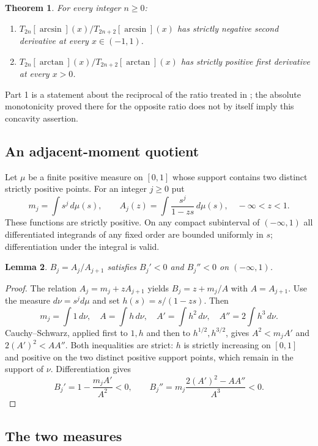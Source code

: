 \documentclass[11pt,a4paper]{article}
\numberwithin{equation}{section}
\newtheorem{theorem}{Theorem}[section]
\newtheorem{lemma}[theorem]{Lemma}
\theoremstyle{definition}
\theoremstyle{remark}
\begin{document}
\begin{theorem}\label{r26meiji:main}
For every integer $n\ge0$:
\begin{enumerate}
\item $T_{2n}[\arcsin](x)/T_{2n+2}[\arcsin](x)$ has strictly negative
second derivative at every $x\in(-1,1)$.
\item $T_{2n}[\arctan](x)/T_{2n+2}[\arctan](x)$ has strictly positive
first derivative at every $x>0$.
\end{enumerate}
\end{theorem}
Part 1 is a statement about the reciprocal of the ratio treated in
\cite[Theorem~5.1]{r26meiji:LQ}; the absolute monotonicity proved there for the
opposite ratio does not by itself imply this concavity assertion.

\subsection{An adjacent-moment quotient}
Let $\mu$ be a finite positive measure on $[0,1]$ whose support contains
two distinct strictly positive points. For an integer $j\ge0$ put
\[
 m_j=\int s^j\,d\mu(s),\qquad
 A_j(z)=\int\frac{s^j}{1-zs}\,d\mu(s),\quad -\infty<z<1.
\]
These functions are strictly positive. On any compact subinterval of
$(-\infty,1)$ all differentiated integrands of any fixed order are
bounded uniformly in $s$; differentiation under the integral is valid.

\begin{lemma}\label{r26meiji:lem}
$B_j=A_j/A_{j+1}$ satisfies $B_j'<0$ and $B_j''<0$ on $(-\infty,1)$.
\end{lemma}
\begin{proof}
The relation $A_j=m_j+zA_{j+1}$ yields $B_j=z+m_j/A$ with
$A=A_{j+1}$. Use the measure $d\nu=s^j d\mu$ and set
$h(s)=s/(1-zs)$. Then
\[
 m_j=\int 1\,d\nu,\quad A=\int h\,d\nu,\quad
 A'=\int h^2\,d\nu,\quad A''=2\int h^3\,d\nu .
\]
Cauchy--Schwarz, applied first to $1,h$ and then to
$h^{1/2},h^{3/2}$, gives $A^2<m_jA'$ and $2(A')^2<AA''$.
Both inequalities are strict: $h$ is strictly increasing on $[0,1]$
and positive on the two distinct positive support points, which
remain in the support of $\nu$. Differentiation gives
\[
 B_j'=1-\frac{m_j A'}{A^2}<0,\qquad
 B_j''=m_j\frac{2(A')^2-AA''}{A^3}<0 .
\]
\end{proof}

\subsection{The two measures}
\end{document}
